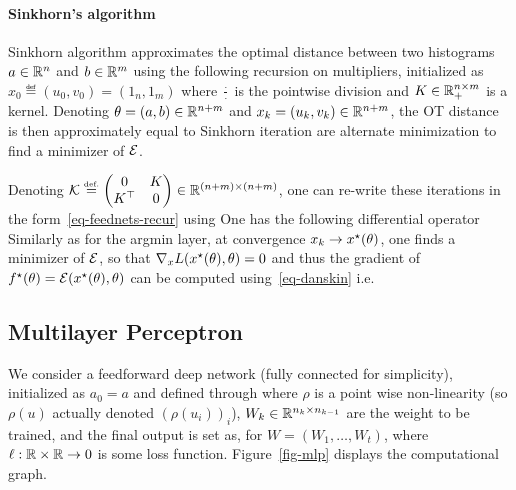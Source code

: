 \paragraph{Sinkhorn's algorithm}

Sinkhorn algorithm approximates the optimal distance between two histograms $a \in \mathbb{R}^n$ and $b \in \mathbb{R}^m$ using the following recursion on multipliers, initialized as $x_0 \eqdef (u_0,v_0) = (1_n,1_m)$
where $\frac{\cdot}{\cdot}$ is the pointwise division and $K \in \mathbb{R}_+^{n \times m}$ is a kernel.
%
Denoting $\theta=(a,b) \in \mathbb{R}^{n+m}$ and $x_k=(u_k,v_k) \in \mathbb{R}^{n+m}$, the OT distance is then approximately equal to 
Sinkhorn iteration are alternate minimization to find a minimizer of $\mathcal{E}$. 

Denoting  $\mathcal{K} \stackrel{\mbox{\upshape\tiny def.}}{=} \begin{pmatrix} 0 & K \\ K^\top & 0 \end{pmatrix} \in \mathbb{R}^{(n+m) \times (n+m)}$, one can re-write these iterations in the form~\eqref{eq-feednets-recur} using 
One has the following differential operator 
Similarly as for the argmin layer, at convergence $x_k \rightarrow x^\star(\theta)$, one finds a minimizer of $\mathcal{E}$, so that $\nabla_x L(x^\star(\theta),\theta)=0$ and thus the gradient of $f^\star(\theta)=\mathcal{E}(x^\star(\theta),\theta)$ can be computed using~\eqref{eq-danskin} i.e.



\subsection{Multilayer Perceptron}
\label{sec-autodiff-mlp}


We consider a feedforward deep network (fully connected for simplicity), initialized as $a_0=a$ and defined through 
where $\rho$ is a point wise non-linearity (so $\rho(u)$ actually denoted $(\rho(u_i))_i$), $W_k \in \mathbb{R}^{n_k \times n_{k-1}}$ are the weight to be trained, and the final output is set as, for $W=(W_1,\ldots,W_t)$, 
where $\ell : \mathbb{R} \times \mathbb{R} \rightarrow 0$ is some loss function. Figure~\ref{fig-mlp} displays the computational graph.

